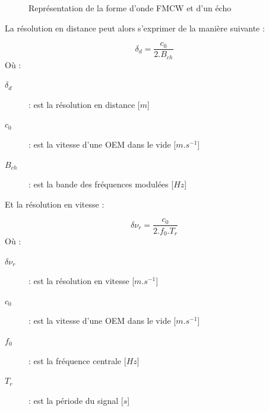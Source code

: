 \begin{figure}[htbp]
    \caption{Représentation de la forme d'onde FMCW et d'un écho}
    \label{fig:fmcw_avec_echo}
\end{figure}

La résolution en distance peut alors s'exprimer de la manière suivante :

\begin{equation}
    \delta_d = \frac{c_0}{2.B_{ch}}
    \label{eq:resolution_distance_fmcw_triangulaire}
\end{equation}
Où :
\begin{description}
    \item[$\delta_d$] : est la résolution en distance [$m$]
    \item[$c_0$] : est la vitesse d'une OEM dans le vide [$m.s^{-1}$]
    \item[$B_{ch}$] : est la bande des fréquences modulées [$Hz$]
\end{description}

Et la résolution en vitesse :

\begin{equation}
    \delta\nu_r = \frac{c_0}{2.f_0.T_r}
    \label{eq:resolution_vitesse_fmcw_triangulaire}
\end{equation}
Où :
\begin{description}
    \item[$\delta\nu_r$] : est la résolution en vitesse [$m.s^{-1}$]
    \item[$c_0$] : est la vitesse d'une OEM dans le vide [$m.s^{-1}$]
    \item[$f_0$] : est la fréquence centrale [$Hz$]
    \item[$T_r$] : est la période du signal [$s$]
\end{description}


